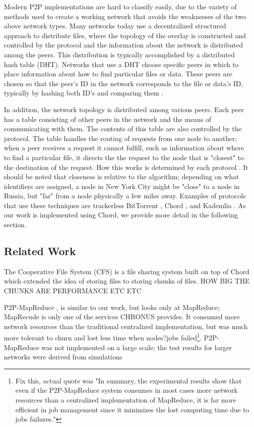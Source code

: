 \documentclass[conference, compsocconf, letterpaper]{IEEEtran}
\begin{document}
Modern P2P implementations are hard to classify easily, due to the variety of methods used to create a working network that avoids the weaknesses of the two above network types.  Many networks today use a decentralized structured approach to distribute files, where the topology of the overlay is constructed and controlled by the protocol and the information about the network is distributed among the peers.  This distribution is typically accomplished by a distributed hash table (DHT).  Networks that use a DHT choose specific peers in which to place information about how to find particular files or data.  These peers are chosen so that the peer's ID in the network corresponds to the file or data's ID, typically by hashing both ID's and comparing them  \cite{SurveyCompare}. 

In addition, the network topology is distributed among various peers.  Each peer has a table consisting of other peers in the network and the means of communicating with them.  The contents of this table are also controlled by the protocol.  The table handles the routing of requests from one node to another; when a peer receives a request it cannot fulfill, such as information about where to find a particular file, it directs the the request to the node that is "closest" to the destination of the request. How this works is determined by each protocol \cite{Chord}.  It should be noted that closeness is relative to the algorithm; depending on what identifiers are assigned, a node in New York City might be "close" to a node in Russia, but "far" from a node physically a few miles away.  Examples of protocols that use these techniques are trackerless BitTorrent \cite{BitTorrent}, Chord \cite{Chord}, and Kademlia \cite{Kademlia}. As our work is implemented using Chord, we provide more detail in the following section. 


\subsection{Related Work}

The Cooperative File System (CFS) is a file sharing system built on top of Chord \cite{CFS} which extended the idea of storing files to storing chunks of files.  HOW BIG THE CHUNKS ARE PERFORMANCE ETC ETC

P2P-MapReduce \cite{marozzo2012p2p}, is similar to our work, but looks only at MapReduce; MapRecude is only one of the services CHRONUS provides.  It consumed more network resources than the traditional centralized implementation, but was much more tolerant to churn and lost less time when nodes?jobs failed\footnote{Fix this, actual quote was "In summary, the experimental results show that even if the P2P-MapReduce system consumes in most cases more network resources than a centralized implementation of MapReduce, it is far more efficient in job management since it minimizes the lost computing time due to jobs failures."}.  P2P-MapReduce was not implemented on a large scale; the test results for larger networks were derived from simulations
\end{document}
